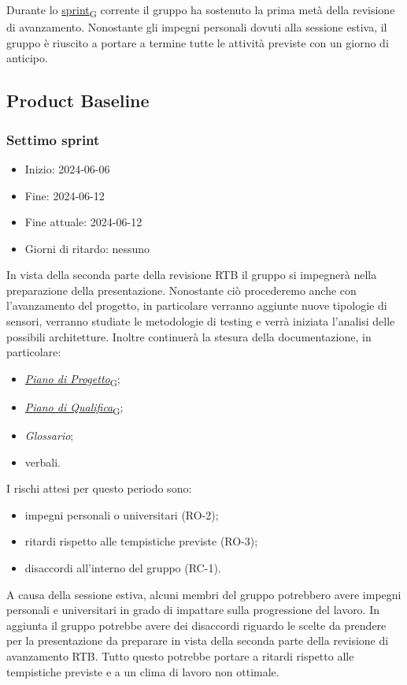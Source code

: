 Durante lo \href{https://7last.github.io/docs/rtb/documentazione-interna/glossario\#sprint}{sprint\textsubscript{G}} corrente il gruppo ha sostenuto la prima metà della revisione di avanzamento. Nonostante gli impegni personali dovuti alla sessione estiva, il gruppo è riuscito a portare a termine tutte le attività previste con un giorno di anticipo.



\newpage
\subsection{Product Baseline}
\subsubsection{Settimo sprint}
\begin{itemize}
	\item Inizio: 2024-06-06
	\item Fine: 2024-06-12
	\item Fine attuale: 2024-06-12
	\item Giorni di ritardo: nessuno
\end{itemize}

In vista della seconda parte della revisione RTB il gruppo si impegnerà nella preparazione della presentazione. Nonostante ciò procederemo anche con l'avanzamento del progetto, in particolare verranno aggiunte nuove tipologie di sensori, verranno studiate le metodologie di testing e verrà iniziata l'analisi delle possibili architetture. Inoltre continuerà la stesura della documentazione, in particolare:
\begin{itemize}
	\item \href{https://7last.github.io/docs/rtb/documentazione-interna/glossario\#piano-di-progetto}{\textit{Piano di Progetto}\textsubscript{G}};
	\item \href{https://7last.github.io/docs/rtb/documentazione-interna/glossario\#piano-di-qualifica}{\textit{Piano di Qualifica}\textsubscript{G}};
	\item \textit{Glossario};
	\item verbali.
\end{itemize}

I rischi attesi per questo periodo sono:
\begin{itemize}
	\item impegni personali o universitari (RO-2);
	\item ritardi rispetto alle tempistiche previste (RO-3);
	\item disaccordi all'interno del gruppo (RC-1).
\end{itemize}
A causa della sessione estiva, alcuni membri del gruppo potrebbero avere impegni personali e universitari in grado di impattare sulla progressione del lavoro. In aggiunta il gruppo potrebbe avere dei disaccordi riguardo le scelte da prendere per la presentazione da preparare in vista della seconda parte della revisione di avanzamento RTB. Tutto questo potrebbe portare a ritardi rispetto alle tempistiche previste e a un clima di lavoro non ottimale.

